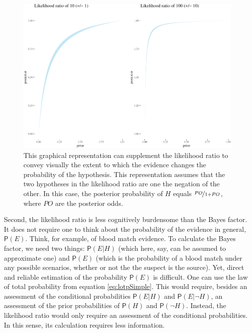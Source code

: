 \documentclass[
  10pt,
  dvipsnames,enabledeprecatedfontcommands]{scrartcl}
\newcommand{\pr}[1]{\mathsf{P}(#1)}
\begin{document}
\begin{figure}[h]

\begin{center}\includegraphics[width=1\linewidth]{lr-chapter4_files/figure-latex/effect-evidence-b-1} \end{center}
\caption{This graphical representation can supplement the likelihood ratio to convey visually the extent to which the evidence changes the probability of the hypothesis. This representation assumes that the two hypotheses in the likelihood ratio are one the negation of the other. In this case, the posterior probability of $H$ equals $\nicefrac{PO}{1+PO}$, where $PO$ are the posterior odds.}
\label{fig:effect-evidence}
\end{figure}

Second, the likelihood ratio is less cognitively burdensome than the
Bayes factor. It does not require one to think about the probability of
the evidence in general, \(\pr{E}\). Think, for example, of blood match
evidence. To calculate the Bayes factor, we need two things:
\(\pr{E\vert H}\) (which here, say, can be assumed to approximate one)
and \(\pr{E}\) (which is the probability of a blood match under any
possible scenarios, whether or not the the suspect is the source). Yet,
direct and reliable estimation of the probability \(\pr{E}\) is
difficult. One can use the law of total probability from equation
\eqref{eq:lotpSimple}. This would require, besides an assessment of the
conditional probabilities \(\pr{E\vert H}\) and \(\pr{E\vert \neg H}\),
an assessment of the prior probabilities of \(\pr{H}\) and
\(\pr{\neg H}\). Instead, the likelihood ratio would only require an
assessment of the conditional probabilities. In this sense, its
calculation requires less information.
\end{document}
